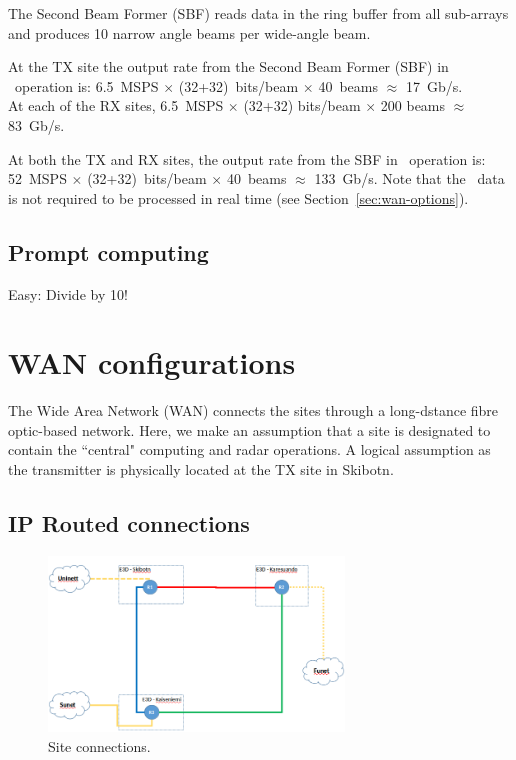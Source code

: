 \documentclass[12pt,a4paper]{article}
\begin{document}
The Second Beam Former (SBF) reads data in the ring buffer from all sub-arrays and produces 10 narrow angle beams per wide-angle beam.

At the TX site the output rate from the Second Beam Former (SBF) in \NBW\ operation is:
6.5~MSPS $\times$ (32+32)~bits/beam $\times$ 40~beams $\approx$ 17~Gb/s. \\
At each of the RX sites, 6.5~MSPS $\times$ (32+32) bits/beam 
$\times$ 200 beams $\approx$ 83~Gb/s.

At both the TX and RX sites, the output rate from the SBF in \WBW\ operation is: \\
52~MSPS $\times$ (32+32)~bits/beam $\times$ 40~beams $\approx$ 133~Gb/s.
Note that the \WBW\ data is not required to be processed in real time (see Section~\ref{sec:wan-options}).



\subsection{Prompt computing}

Easy: Divide by 10!

\section{WAN configurations}

The Wide Area Network (WAN) connects the \ED sites through a long-dstance fibre optic-based network.
Here, we make an assumption that a site is designated to contain the ``central" computing and radar operations. 
A logical assumption as the transmitter is physically located at the TX site in Skibotn.

\subsection{IP Routed connections}
\begin{figure}[h]
\centering
\includegraphics[width=0.7\textwidth]{Site_Connections.png}
\caption{Site connections.\label{fig:site-connections}
}
\end{figure}
\end{document}
